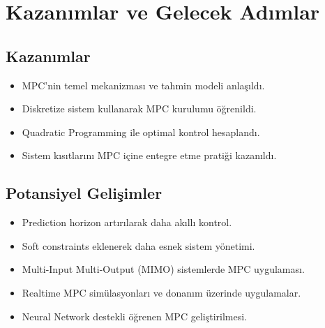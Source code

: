 \documentclass[12pt,a4paper]{article}
\begin{document}
\section{Kazanımlar ve Gelecek Adımlar}

\subsection{Kazanımlar}
\begin{itemize}
\item MPC'nin temel mekanizması ve tahmin modeli anlaşıldı.
\item Diskretize sistem kullanarak MPC kurulumu öğrenildi.
\item Quadratic Programming ile optimal kontrol hesaplandı.
\item Sistem kısıtlarını MPC içine entegre etme pratiği kazanıldı.
\end{itemize}

\subsection{Potansiyel Gelişimler}
\begin{itemize}
\item Prediction horizon artırılarak daha akıllı kontrol.
\item Soft constraints eklenerek daha esnek sistem yönetimi.
\item Multi-Input Multi-Output (MIMO) sistemlerde MPC uygulaması.
\item Realtime MPC simülasyonları ve donanım üzerinde uygulamalar.
\item Neural Network destekli öğrenen MPC geliştirilmesi.
\end{itemize}
\end{document}
